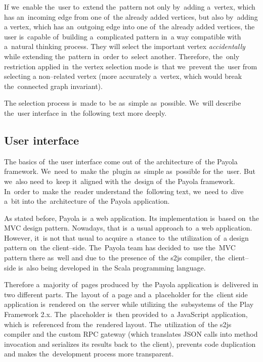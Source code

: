 If we~enable the~user to~extend the~pattern not only by~adding a~vertex, 
which has an~incoming edge from one of~the already added vertices, but also by~adding 
a vertex, which has an~outgoing edge into one of~the already added vertices, 
the user is~capable of~building a~complicated pattern in~a way compatible with a~natural thinking process.
They will select the
important vertex \emph{accidentally} while extending the~pattern in~order to~select another. Therefore, the~only restriction 
applied in~the vertex selection mode is~that we~prevent the~user from selecting 
a non--related vertex (more accurately a~vertex, which would break the~connected 
graph invariant).

The selection process is~made to~be as~simple as~possible. We~will describe the~user interface in~the following text more deeply.

\subsection{User interface}
The basics of~the user interface come out of~the architecture of~the Payola 
framework. We~need to~make the~plugin as~simple as~possible for the~user. But we~also need to~keep it~aligned with the~design of~the Payola framework. In~order to~make the~reader understand the~following text, we~need to~dive a~bit into the~architecture of~the Payola application.

As stated before, Payola is~a web application. Its implementation is~based on~the MVC 
design pattern. Nowadays, that is~a usual approach to~a web application. However, it~is not that usual 
to acquire a~stance to~the utilization of~a design pattern on~the client--side. The~Payola team has decided to~use the~MVC pattern there as~well and due to~the presence of~the s2js compiler, the~client--side is~also being developed in~the Scala programming language.

Therefore a~majority of~pages produced by~the Payola application is~delivered 
in two different parts. The~layout of~a page and a~placeholder for the~client 
side application is~rendered on~the server while utilizing the~subsystems of~the 
Play Framework 2.x. The~placeholder is~then provided to~a JavaScript application,
which is~referenced from the~rendered layout. The~utilization of~the s2js compiler and
the custom RPC gateway (which translates JSON calls into method invocation and serializes its results
back to~the client), prevents code duplication and makes the~development process more transparent.

